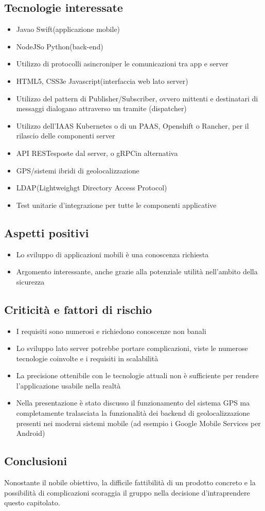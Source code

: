 \subsection{Tecnologie interessate}
\begin{itemize}
	\item Java\glo o Swift\glo (applicazione mobile)
	\item NodeJS\glo o Python\glo (back-end\glo)
	\item Utilizzo di protocolli asincroni\glosp per le comunicazioni tra app e server
	\item HTML5\glo, CSS3\glo e Javascript\glo (interfaccia web lato server)
	\item Utilizzo del pattern di Publisher/Subscriber\glo, ovvero mittenti e destinatari di messaggi dialogano attraverso un tramite (dispatcher)
	\item Utilizzo dell’IAAS Kubernetes o di un PAAS, Openshift o Rancher, per il rilascio delle componenti server
	\item API REST\glosp esposte dal server, o gRPC\glo in alternativa
	\item GPS\glo/sistemi ibridi di geolocalizzazione
	\item LDAP\glo (Lightweighgt Directory Access Protocol)
	\item Test unitari\glosp e d'integrazione per tutte le componenti applicative
\end{itemize}

\subsection{Aspetti positivi}
\begin{itemize}
	\item Lo sviluppo di applicazioni mobili è una conoscenza richiesta
	\item Argomento interessante, anche grazie alla potenziale utilità nell'ambito della sicurezza
\end{itemize}

\subsection{Criticità e fattori di rischio}
\begin{itemize}
	\item I requisiti sono numerosi e richiedono conoscenze non banali
	\item Lo sviluppo lato server potrebbe portare complicazioni, viste le numerose tecnologie coinvolte e i requisiti in scalabilità
	\item La precisione ottenibile con le tecnologie attuali non è sufficiente per rendere l’applicazione usabile nella realtà
	\item Nella presentazione è stato discusso il funzionamento del sistema GPS ma completamente tralasciata la funzionalità dei backend di geolocalizzazione presenti nei moderni sistemi mobile (ad esempio i Google Mobile Services per Android)
\end{itemize}

\subsection{Conclusioni}
Nonostante il nobile obiettivo, la difficile fattibilità di un prodotto concreto e la possibilità di complicazioni scoraggia il gruppo nella decisione d'intraprendere questo capitolato.
